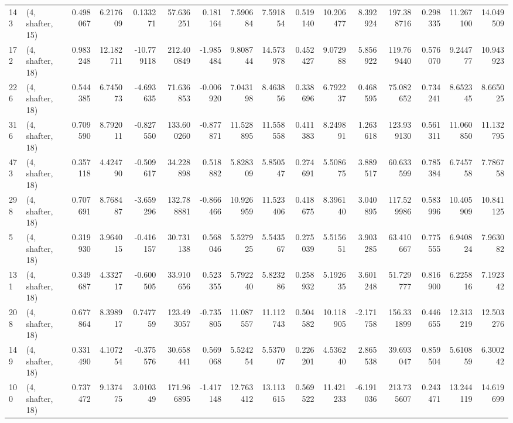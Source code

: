 \begin{tabular}{llrrrrrrrrrrrrrr}
143 &  (4, shafter, 15) &   0.498067 &   6.217609 &   0.133271 &    57.636251 &   0.181164 &   7.590684 &   7.591854 &  0.519140 &  10.206477 &   8.392924 &   197.388716 &   0.298335 &  11.267100 &  14.049509 \\
172 &  (4, shafter, 18) &   0.983248 &  12.182711 & -10.779118 &   212.400849 &  -1.985484 &   9.808744 &  14.573978 &  0.452427 &   9.072988 &   5.856922 &   119.769440 &   0.576070 &   9.244777 &  10.943923 \\
226 &  (4, shafter, 18) &   0.544385 &   6.745073 &  -4.693635 &    71.636853 &  -0.006920 &   7.043198 &   8.463856 &  0.338696 &   6.792237 &   0.468595 &    75.082652 &   0.734241 &   8.652345 &   8.665025 \\
316 &  (4, shafter, 18) &   0.709590 &   8.792011 &  -0.827550 &   133.600260 &  -0.877871 &  11.528895 &  11.558558 &  0.411383 &   8.249891 &   1.263618 &   123.939130 &   0.561311 &  11.060850 &  11.132795 \\
473 &  (4, shafter, 18) &   0.357118 &   4.424790 &  -0.509617 &    34.228898 &   0.518882 &   5.828309 &   5.850547 &  0.274691 &   5.508675 &   3.889517 &    60.633599 &   0.785384 &   6.745758 &   7.786758 \\
298 &  (4, shafter, 18) &   0.707691 &   8.768487 &  -3.659296 &   132.788881 &  -0.866466 &  10.926959 &  11.523406 &  0.418675 &   8.396140 &   3.040895 &   117.529986 &   0.583996 &  10.405909 &  10.841125 \\
5   &  (4, shafter, 18) &   0.319930 &   3.964015 &  -0.416157 &    30.731138 &   0.568046 &   5.527925 &   5.543567 &  0.275039 &   5.515651 &   3.903285 &    63.410667 &   0.775555 &   6.940824 &   7.963082 \\
131 &  (4, shafter, 18) &   0.349687 &   4.332717 &  -0.600505 &    33.910656 &   0.523355 &   5.792240 &   5.823286 &  0.258932 &   5.192635 &   3.601248 &    51.729777 &   0.816900 &   6.225816 &   7.192342 \\
208 &  (4, shafter, 18) &   0.677864 &   8.398917 &   0.747759 &   123.493057 &  -0.735805 &  11.087557 &  11.112743 &  0.504582 &  10.118905 &  -2.171758 &   156.331899 &   0.446655 &  12.313219 &  12.503276 \\
149 &  (4, shafter, 18) &   0.331490 &   4.107254 &  -0.375576 &    30.658441 &   0.569068 &   5.524254 &   5.537007 &  0.226201 &   4.536240 &   2.865538 &    39.693047 &   0.859504 &   5.610859 &   6.300242 \\
100 &  (4, shafter, 18) &   0.737472 &   9.137475 &   3.010349 &   171.966895 &  -1.417148 &  12.763412 &  13.113615 &  0.569522 &  11.421233 &  -6.191036 &   213.735607 &   0.243471 &  13.244119 &  14.619699 \\

\end{tabular}
